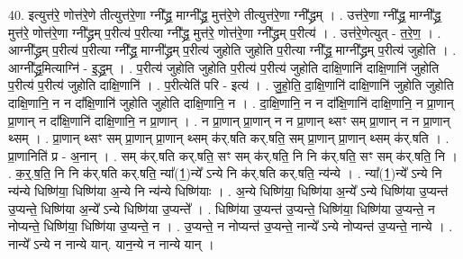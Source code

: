 \documentclass[17pt]{extarticle}
\begin{document}
40. इत्युत्त॑रे॒ णोत्त॑रे॒णे तीत्युत्त॑रे॒णा ग्नी᳚द्ध्र॒ माग्नी᳚द्ध्र॒ मुत्त॑रे॒णे तीत्युत्त॑रे॒णा ग्नी᳚द्ध्रम् । . उत्त॑रे॒णा ग्नी᳚द्ध्र॒ माग्नी᳚द्ध्र॒ मुत्त॑रे॒ णोत्त॑रे॒णा ग्नी᳚द्ध्रम् प॒रीत्य॑ प॒रीत्या ग्नी᳚द्ध्र॒ मुत्त॑रे॒
णोत्त॑रे॒णा ग्नी᳚द्ध्रम् प॒रीत्य॑ । . उत्त॑रे॒णेत्युत् - त॒रे॒ण॒ । . आग्नी᳚द्ध्रम् प॒रीत्य॑ प॒रीत्या ग्नी᳚द्ध्र॒ माग्नी᳚द्ध्रम् प॒रीत्य॑ जुहोति जुहोति प॒रीत्या ग्नी᳚द्ध्र॒ माग्नी᳚द्ध्रम् प॒रीत्य॑ जुहोति । . आग्नी᳚द्ध्र॒मित्याग्नि॑ - इ॒द्ध्र॒म् । . प॒रीत्य॑ जुहोति जुहोति प॒रीत्य॑ प॒रीत्य॑ जुहोति दाक्षि॒णानि॑ दाक्षि॒णानि॑ जुहोति प॒रीत्य॑ प॒रीत्य॑ जुहोति दाक्षि॒णानि॑ । . प॒रीत्येति॑ परि - इत्य॑ । . जु॒हो॒ति॒ दा॒क्षि॒णानि॑ दाक्षि॒णानि॑ जुहोति जुहोति दाक्षि॒णानि॒ न न दा᳚क्षि॒णानि॑ जुहोति जुहोति दाक्षि॒णानि॒ न । . दा॒क्षि॒णानि॒ न न दा᳚क्षि॒णानि॑ दाक्षि॒णानि॒ न प्रा॒णान् प्रा॒णान् न दा᳚क्षि॒णानि॑ दाक्षि॒णानि॒ न प्रा॒णान् । . न प्रा॒णान् प्रा॒णान् न न प्रा॒णान् थ्सꣳ सम् प्रा॒णान् न न प्रा॒णान् थ्सम् । . प्रा॒णान् थ्सꣳ सम् प्रा॒णान् प्रा॒णान् थ्सम् क॑र्.षति कर्.षति॒ सम् प्रा॒णान् प्रा॒णान् थ्सम् क॑र्.षति । . प्रा॒णानिति॑ प्र - अ॒नान् । . सम् क॑र्.षति कर्.षति॒ सꣳ सम् क॑र्.षति॒ नि नि क॑र्.षति॒ सꣳ सम् क॑र्.षति॒ नि । . क॒र्॒.ष॒ति॒ नि नि क॑र्.षति कर्.षति॒ न्या᳚(1॒)न्ये᳚ ऽन्ये नि क॑र्.षति कर्.षति॒ न्य॑न्ये । . न्या᳚(1॒)न्ये᳚ ऽन्ये नि न्य॑न्ये धिष्णि॑या॒ धिष्णि॑या अ॒न्ये नि न्य॑न्ये धिष्णि॑याः । . अ॒न्ये धिष्णि॑या॒ धिष्णि॑या अ॒न्ये᳚ ऽन्ये धिष्णि॑या उ॒प्यन्त॑ उ॒प्यन्ते॒ धिष्णि॑या अ॒न्ये᳚ ऽन्ये धिष्णि॑या उ॒प्यन्ते᳚ । . धिष्णि॑या उ॒प्यन्त॑ उ॒प्यन्ते॒ धिष्णि॑या॒ धिष्णि॑या उ॒प्यन्ते॒ न नोप्यन्ते॒ धिष्णि॑या॒ धिष्णि॑या उ॒प्यन्ते॒ न । . उ॒प्यन्ते॒ न नोप्यन्त॑ उ॒प्यन्ते॒ नान्ये᳚ ऽन्ये नोप्यन्त॑ उ॒प्यन्ते॒ नान्ये । . नान्ये᳚ ऽन्ये न नान्ये यान्. यान॒न्ये न नान्ये यान् । \newline
\end{document}
